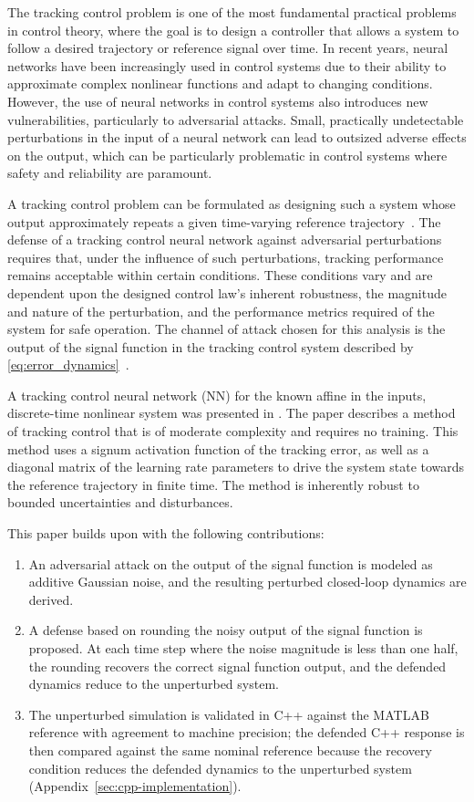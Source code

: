 The tracking control problem is one of the most fundamental practical problems
in control theory, where the goal is to design a controller that allows a system
to follow a desired trajectory or reference signal over time. In recent years,
neural networks have been increasingly used in control systems due to their ability
to approximate complex nonlinear functions and adapt to changing conditions. However,
the use of neural networks in control systems also introduces new vulnerabilities,
particularly to adversarial attacks. Small, practically undetectable perturbations
in the input of a neural network can lead to outsized adverse effects on the output,
which can be particularly problematic in control systems where safety and reliability are paramount.
\par
A tracking control problem can be formulated as designing such a system whose output
approximately repeats a given time-varying reference trajectory~\cite{tymoshchuk2024tracking}.
The defense of a tracking control neural network against adversarial perturbations
requires that, under the influence of such perturbations, tracking performance
remains acceptable within certain conditions. These conditions vary and are dependent
upon the designed control law's inherent robustness, the magnitude and nature of
the perturbation, and the performance metrics required of the system for safe operation.
The channel of attack chosen for this analysis is the output of the signal
function in the tracking control system described by
\eqref{eq:error_dynamics}~\cite{tymoshchuk2024tracking}.
\par
A tracking control neural network (NN) for the known affine in the inputs, discrete-time
nonlinear system was presented in \cite{tymoshchuk2024tracking}. The paper describes
a method of tracking control that is of moderate complexity and requires no training.
This method uses a signum activation function of the tracking error, as well as a diagonal matrix of the
learning rate parameters to drive the system state towards the reference trajectory
in finite time. The method is inherently robust to bounded uncertainties and disturbances.
\par
This paper builds upon \cite{tymoshchuk2024tracking} with the following contributions:
\begin{enumerate}
		\item An adversarial attack on the output of the signal function is
		      modeled as additive Gaussian noise, and the resulting perturbed
		      closed-loop dynamics are derived.
	\item A defense based on rounding the noisy output of the signal function
	      is proposed. At each time step where the noise magnitude is less than
	      one half, the rounding recovers the correct signal function output, and
	      the defended dynamics reduce to the unperturbed system.
	\item The unperturbed simulation is validated in C++ against the MATLAB
	      reference with agreement to machine precision; the defended
	      C++ response is then compared against the same nominal reference because
	      the recovery condition reduces the defended dynamics to the unperturbed
	      system (Appendix~\ref{sec:cpp-implementation}).
\end{enumerate}
